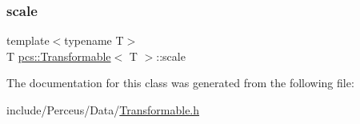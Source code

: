 \mbox{\label{classpcs_1_1Transformable_ad2fabe2ecf3a75bcb76597b33182ba0d}} 
\subsubsection{\texorpdfstring{scale}{scale}}
{\footnotesize\ttfamily template$<$typename T$>$ \\
T \hyperlink{classpcs_1_1Transformable}{pcs\+::\+Transformable}$<$ T $>$\+::scale\hspace{0.3cm}{\ttfamily [private]}}



The documentation for this class was generated from the following file\+:\begin{DoxyCompactItemize}
\item 
include/\+Perceus/\+Data/\hyperlink{Transformable_8h}{Transformable.\+h}\end{DoxyCompactItemize}
